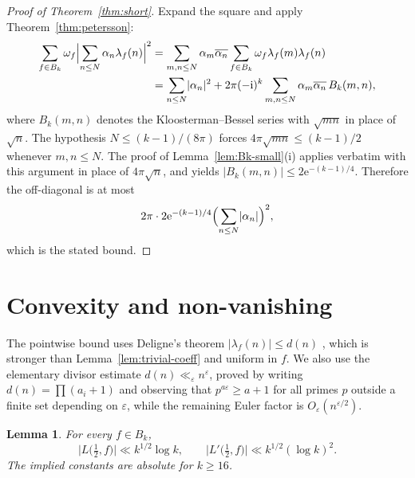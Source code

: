 \documentclass[11pt]{amsart}
\newtheorem{lemma}[theorem]{Lemma}
\theoremstyle{definition}
\theoremstyle{remark}
\numberwithin{equation}{section}
\newcommand{\ee}{\mathrm{e}}
\newcommand{\ii}{\mathrm{i}}
\newcommand{\eps}{\varepsilon}
\begin{document}
\begin{proof}[Proof of Theorem~\ref{thm:short}]
Expand the square and apply Theorem~\ref{thm:petersson}:
\begin{align*}
\sum_{f\in B_k}\omega_f\Bigl\lvert\sum_{n\le N}\alpha_n\lambda_f(n)\Bigr\rvert^2
&=\sum_{m,n\le N}\alpha_m\overline{\alpha_n}
\sum_{f\in B_k}\omega_f\lambda_f(m)\lambda_f(n)\\
&=\sum_{n\le N}\lvert\alpha_n\rvert^2
+2\pi(-\ii)^k\sum_{m,n\le N}\alpha_m\overline{\alpha_n}\,B_k(m,n),
\end{align*}
where $B_k(m,n)$ denotes the Kloosterman--Bessel series with $\sqrt{mn}$ in place of $\sqrt n$. The hypothesis $N\le(k-1)/(8\pi)$ forces $4\pi\sqrt{mn}\le(k-1)/2$ whenever $m,n\le N$. The proof of Lemma~\ref{lem:Bk-small}(i) applies verbatim with this argument in place of $4\pi\sqrt n$, and yields $\lvert B_k(m,n)\rvert\le 2\ee^{-(k-1)/4}$. Therefore the off-diagonal is at most
\[
2\pi\cdot 2\ee^{-(k-1)/4}\Bigl(\sum_{n\le N}\lvert\alpha_n\rvert\Bigr)^2,
\]
which is the stated bound.
\end{proof}

\section{Convexity and non-vanishing}
\label{sec:nonvan}

The pointwise bound uses Deligne's theorem $\lvert\lambda_f(n)\rvert\le d(n)$ \cite{Deligne1974}, which is stronger than Lemma~\ref{lem:trivial-coeff} and uniform in $f$. We also use the elementary divisor estimate $d(n)\ll_\eps n^\eps$, proved by writing $d(n)=\prod(a_i+1)$ and observing that $p^{a\eps}\ge a+1$ for all primes $p$ outside a finite set depending on $\eps$, while the remaining Euler factor is $O_\eps(n^{\eps/2})$.

\begin{lemma}\label{lem:pointwise}
For every $f\in B_k$,
\[
\bigl\lvert L\bigl(\tfrac12,f\bigr)\bigr\rvert
\ll k^{1/2}\log k,
\qquad
\bigl\lvert L'\bigl(\tfrac12,f\bigr)\bigr\rvert
\ll k^{1/2}(\log k)^2.
\]
The implied constants are absolute for $k\ge 16$.
\end{lemma}
\end{document}
